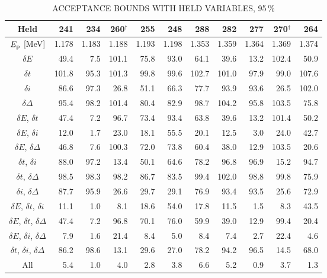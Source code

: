 \begin{table}
\small
    \begin{center}
        \caption{ACCEPTANCE BOUNDS WITH HELD VARIABLES, 95\,\%}
        \label{tab:acceptance-uncertainty-95}
        \begin{tabular}{crrrrrrrrrr}
            \toprule
            \midrule
            \textbf{Held}
                & \textbf{241} & \textbf{234} & \textbf{260}$^\dagger$ & \textbf{255} & \textbf{248}
                & \textbf{288} & \textbf{282} & \textbf{277} & \textbf{270}$^\dagger$ & \textbf{264} \\
            \midrule
$E_{\rm p}$ [MeV] & 1.178 & 1.183 & 1.188 & 1.193 & 1.198 & 1.353 & 1.359 & 1.364 & 1.369 & 1.374 \\
\midrule
$\delta E$     &  49.4 &   7.5 & 101.1 &  75.8 &  93.0 &  64.1 &  39.6 &  13.2 & 102.4 &  50.9 \\
$\delta t$     & 101.8 &  95.3 & 101.3 &  99.8 &  99.6 & 102.7 & 101.0 &  97.9 &  99.0 & 107.6 \\
$\delta i$     &  86.6 &  97.3 &  26.8 &  51.1 &  66.3 &  77.7 &  93.9 &  93.6 &  26.5 & 102.0 \\
$\delta\Delta$ &  95.4 &  98.2 & 101.4 &  80.4 &  82.9 &  98.7 & 104.2 &  95.8 & 103.5 &  75.8 \\
$\delta E$, $\delta t$     &  47.4 &   7.2 &  96.7 &  73.4 &  93.4 &  63.8 &  39.6 &  13.2 & 101.4 &  50.2 \\
$\delta E$, $\delta i$     &  12.0 &   1.7 &  23.0 &  18.1 &  55.5 &  20.1 &  12.5 &   3.0 &  24.0 &  42.7 \\
$\delta E$, $\delta\Delta$ &  46.8 &   7.6 & 100.3 &  72.0 &  73.8 &  60.4 &  38.0 &  12.9 & 103.5 &  20.6 \\
$\delta t$, $\delta i$     &  88.0 &  97.2 &  13.4 &  50.1 &  64.6 &  78.2 &  96.8 &  96.9 &  15.2 &  94.7 \\
$\delta t$, $\delta\Delta$ &  98.5 &  98.3 &  98.2 &  86.7 &  83.5 &  99.4 & 102.0 &  98.8 &  99.8 &  75.9 \\
$\delta i$, $\delta\Delta$ &  87.7 &  95.9 &  26.6 &  29.7 &  29.1 &  76.9 &  93.4 &  93.5 &  25.6 &  72.9 \\
$\delta E$, $\delta t$, $\delta i$     &  11.1 &   1.0 &   8.1 &  18.6 &  54.0 &  17.8 &  11.5 &   1.5 &   8.3 &  43.5 \\
$\delta E$, $\delta t$, $\delta\Delta$ &  47.4 &   7.2 &  96.8 &  70.1 &  76.0 &  59.9 &  39.0 &  12.9 &  99.4 &  20.4 \\
$\delta E$, $\delta i$, $\delta\Delta$ &   7.9 &   1.6 &  21.4 &   8.4 &   5.0 &   8.4 &   7.4 &   2.7 &  22.4 &   4.6 \\
$\delta t$, $\delta i$, $\delta\Delta$ &  86.2 &  98.6 &  13.1 &  29.6 &  27.0 &  78.2 &  94.2 &  96.5 &  14.5 &  68.0 \\
All &   5.4 &   1.0 &   4.0 &   2.8 &   3.8 &   6.6 &   5.2 &   0.9 &   3.7 &   1.3 \\
            \bottomrule
        \end{tabular}


\end{center}
\end{table}
